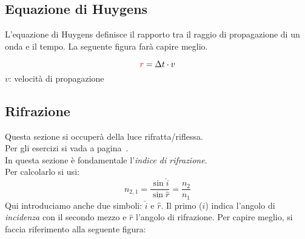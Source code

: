 \subsection{Equazione di Huygens}
L'equazione di Huygens definisce il rapporto tra il raggio di propagazione di un onda e il tempo.
La seguente figura farà capire meglio.

\begin{center}
\end{center}
\begin{equation*}
  \mathcolor{red}{r} = \Delta t\cdot v
\end{equation*}
$v$: velocità di propagazione

\subsection{Rifrazione}\label{subsec:onde:rifrazione}
Questa sezione si occuperà della luce rifratta/riflessa.\\
Per gli esercizi si vada a pagina~\pageref{ex:rifrazione}.\\ [\baselineskip]
In questa sezione è fondamentale l'\emph{indice di rifrazione}.\\
Per calcolarlo si usi:
\begin{equation*}
  n_{2,1} = \frac{\sin\hat{i}}{\sin\hat{r}} = \frac{n_2}{n_1}
\end{equation*}
Qui introduciamo anche due simboli: $\hat{i}$ e $\hat{r}$. Il primo ($\hat{i}$) indica l'angolo di
\emph{incidenza} con il secondo mezzo e $\hat{r}$ l'angolo di rifrazione. Per capire meglio, si
faccia riferimento alla seguente figura:

